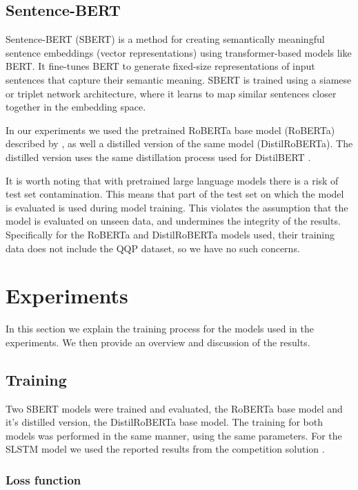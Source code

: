 \documentclass[10pt, a4paper]{article}
\begin{document}
\subsection{Sentence-BERT}

Sentence-BERT (SBERT) is a method for creating semantically meaningful sentence embeddings (vector representations) using transformer-based models like BERT. It fine-tunes BERT to generate fixed-size representations of input sentences that capture their semantic meaning. SBERT is trained using a siamese or triplet network architecture, where it learns to map similar sentences closer together in the embedding space.

In our experiments we used the pretrained RoBERTa base model (RoBERTa) described by \citet{liu2019roberta}, as well a distilled version of the same model (DistilRoBERTa). The distilled version uses the same distillation process used for DistilBERT \cite{sanh2019distilbert}.

It is worth noting that with pretrained large language models there is a risk of test set contamination.
This means that part of the test set on which the model is evaluated is used during model training. This violates the assumption that the model is evaluated on unseen data, and undermines the integrity of the results.
Specifically for the RoBERTa and DistilRoBERTa models used, their training data does not include the QQP dataset, so we have no such concerns.

\section{Experiments}

In this section we explain the training process for the models used in the experiments.
We then provide an overview and discussion of the results.

\subsection{Training} \label{training}

Two SBERT models were trained and evaluated, the RoBERTa base model and it's distilled version, the DistilRoBERTa base model.
The training for both models was performed in the same manner, using the same parameters.
For the SLSTM model we used the reported results from the competition solution \citep{dadashov2017quora}.

\subsubsection{Loss function}
\end{document}
